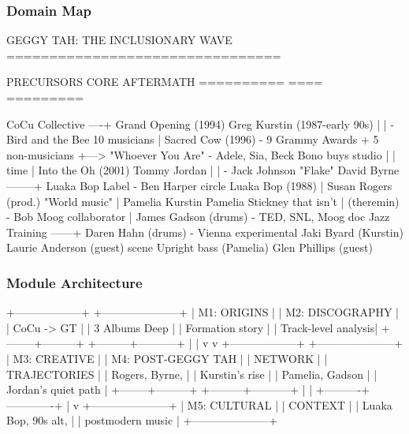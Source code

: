 \documentclass[11pt,letterpaper]{article}
\begin{document}
\subsubsection{Domain Map}

\begin{asciibox}
                    GEGGY TAH: THE INCLUSIONARY WAVE
                    ================================

  PRECURSORS                    CORE                      AFTERMATH
  ==========                    ====                      =========

  CoCu Collective ----+     Grand Opening (1994)     Greg Kurstin
  (1987-early 90s)    |         |                    - Bird and the Bee
  10 musicians        |     Sacred Cow (1996)        - 9 Grammy Awards
  + 5 non-musicians   +---> "Whoever You Are"        - Adele, Sia, Beck
  Bono buys studio    |         |                    
  time                |     Into the Oh (2001)       Tommy Jordan
                      |         |                    - Jack Johnson "Flake"
  David Byrne --------+     Luaka Bop Label          - Ben Harper circle
  Luaka Bop (1988)    |     Susan Rogers (prod.)     
  "World music"       |     Pamelia Kurstin          Pamelia Stickney
  that isn't          |     (theremin)               - Bob Moog collaborator
                      |     James Gadson (drums)     - TED, SNL, Moog doc
  Jazz Training ------+     Daren Hahn (drums)       - Vienna experimental
  Jaki Byard (Kurstin)      Laurie Anderson (guest)    scene
  Upright bass (Pamelia)    Glen Phillips (guest)
\end{asciibox}

\subsubsection{Module Architecture}

\begin{asciibox}
  +------------------+    +---------------------+
  | M1: ORIGINS      |    | M2: DISCOGRAPHY     |
  | CoCu -> GT       |    | 3 Albums Deep       |
  | Formation story   |    | Track-level analysis|
  +--------+---------+    +---------+-----------+
           |                        |
           v                        v
  +------------------+    +---------------------+
  | M3: CREATIVE     |    | M4: POST-GEGGY TAH  |
  | NETWORK          |    | TRAJECTORIES        |
  | Rogers, Byrne,   |    | Kurstin's rise      |
  | Pamelia, Gadson   |    | Jordan's quiet path |
  +--------+---------+    +---------+-----------+
           |                        |
           +----------+-------------+
                      |
                      v
           +---------------------+
           | M5: CULTURAL        |
           | CONTEXT             |
           | Luaka Bop, 90s alt, |
           | postmodern music    |
           +---------------------+
\end{asciibox}
\end{document}
